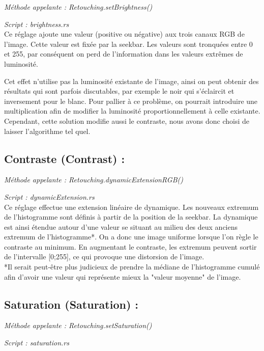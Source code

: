 \emph{Méthode appelante : Retouching.setBrightness()}

\emph{Script : brightness.rs}
\\

Ce réglage ajoute une valeur (positive ou négative) aux trois canaux RGB de l'image. Cette valeur est fixée par la seekbar.
Les valeurs sont tronquées entre 0 et 255, par conséquent on perd de l'information dans les valeurs extrêmes de luminosité.

Cet effet n'utilise pas la luminosité existante de l'image, ainsi on peut obtenir des résultats qui sont parfois discutables, par exemple
le noir qui s'éclaircit et inversement pour le blanc. Pour pallier à ce problème, on pourrait introduire une multiplication afin de modifier
la luminosité proportionnellement à celle existante. Cependant, cette solution modifie aussi le contraste, nous avons donc choisi
de laisser l'algorithme tel quel.


\subsection{Contraste (Contrast) :}

\emph{Méthode appelante : Retouching.dynamicExtensionRGB()}

\emph{Script : dynamicExtension.rs}
\\

Ce réglage effectue une extension linéaire de dynamique. Les nouveaux extremum de l'histogramme sont définis à partir de la position de la seekbar.
La dynamique est ainsi étendue autour d'une valeur se situant au milieu des deux anciens extremum de l'histogramme*. On a donc une image uniforme lorsque
l'on règle le contraste au minimum. En augmentant le contraste, les extremum peuvent sortir de l'intervalle [0;255], ce qui provoque une distorsion de l'image.
\\

*Il serait peut-être plus judicieux de prendre la médiane de l'histogramme cumulé afin d'avoir une valeur qui représente mieux la "valeur moyenne" de l'image.


\subsection{Saturation (Saturation) :}

\emph{Méthode appelante : Retouching.setSaturation()}

\emph{Script : saturation.rs}
\\

